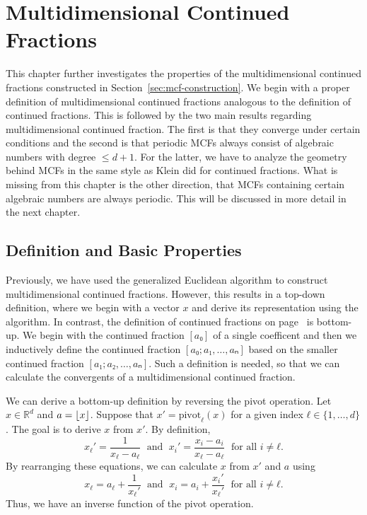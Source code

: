 \chapter{Multidimensional Continued Fractions}
\label{ch:mdcf}

This chapter further investigates the properties of the multidimensional
continued fractions constructed in Section~\ref{sec:mcf-construction}.
We begin with a proper definition of multidimensional continued fractions
analogous to the definition of continued fractions.
This is followed by the two main results regarding multidimensional continued fraction.
The first is that they converge under certain conditions
and the second is that periodic MCFs always consist of algebraic numbers with degree $≤ d+1$.
For the latter, we have to analyze the geometry behind MCFs in the same
style as Klein did for continued fractions.
What is missing from this chapter is the other direction,
that MCFs containing certain algebraic numbers are always periodic.
This will be discussed in more detail in the next chapter.

\section{Definition and Basic Properties}
\label{sec:mcf-definition}

Previously, we have used the generalized Euclidean algorithm to construct multidimensional continued fractions.
However, this results in a top-down definition,
where we begin with a vector $x$ and derive its representation using the algorithm.
In contrast, the definition of continued fractions on page~\pageref{def:cont-frac} is bottom-up.
We begin with the continued fraction $[a₀]$ of a single coefficent
and then we inductively define the continued fraction $[a₀; a₁, …, aₙ]$
based on the smaller continued fraction $[a₁; a₂, …, aₙ]$.
Such a definition is needed, so that we can calculate the convergents of a
multidimensional continued fraction.

We can derive a bottom-up definition by reversing the pivot operation.
Let $x ∈ ℝ^d$ and $a = \left\lfloor x\right\rfloor$.
Suppose that $x' = \mathrm{pivot}_ℓ(x)$ for a given index $ℓ ∈ \{1, …, d\}$.
The goal is to derive $x$ from $x'$.
By definition,
\[
  x_ℓ' = \frac{1}{x_ℓ - a_ℓ}
  \; \text{ and } \;
  x_i' = \frac{x_i - a_i}{x_ℓ - a_ℓ}
  \; \text{ for all } i ≠ ℓ.
\]
By rearranging these equations, we can calculate $x$ from $x'$ and $a$ using
\[
  x_ℓ = a_ℓ + \frac{1}{x_ℓ'}
  \; \text{ and } \;
  x_i = a_i + \frac{x_i'}{x_ℓ'}
  \; \text{ for all } i ≠ ℓ.
\]
Thus, we have an inverse function of the pivot operation.

